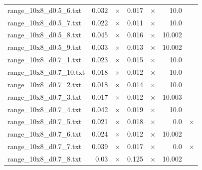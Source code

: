 \documentclass{article}
\begin{document}
\begin{center}
\begin{tabular}{lrrrrrr}
range\_10x8\_d0.5\_6.txt & 0.032 & 
$\times$
 & 0.017 & 
$\times$
 & 10.0 & 
\\
range\_10x8\_d0.5\_7.txt & 0.022 & 
$\times$
 & 0.011 & 
$\times$
 & 10.0 & 
\\
range\_10x8\_d0.5\_8.txt & 0.045 & 
$\times$
 & 0.016 & 
$\times$
 & 10.002 & 
\\
range\_10x8\_d0.5\_9.txt & 0.033 & 
$\times$
 & 0.013 & 
$\times$
 & 10.002 & 
\\
range\_10x8\_d0.7\_1.txt & 0.023 & 
$\times$
 & 0.015 & 
$\times$
 & 10.0 & 
\\
range\_10x8\_d0.7\_10.txt & 0.018 & 
$\times$
 & 0.012 & 
$\times$
 & 10.0 & 
\\
range\_10x8\_d0.7\_2.txt & 0.018 & 
$\times$
 & 0.014 & 
$\times$
 & 10.0 & 
\\
range\_10x8\_d0.7\_3.txt & 0.017 & 
$\times$
 & 0.012 & 
$\times$
 & 10.003 & 
\\
range\_10x8\_d0.7\_4.txt & 0.042 & 
$\times$
 & 0.019 & 
$\times$
 & 10.0 & 
\\
range\_10x8\_d0.7\_5.txt & 0.021 & 
$\times$
 & 0.018 & 
$\times$
 & 0.0 & 
$\times$
\\
range\_10x8\_d0.7\_6.txt & 0.024 & 
$\times$
 & 0.012 & 
$\times$
 & 10.002 & 
\\
range\_10x8\_d0.7\_7.txt & 0.039 & 
$\times$
 & 0.017 & 
$\times$
 & 0.0 & 
$\times$
\\
range\_10x8\_d0.7\_8.txt & 0.03 & 
$\times$
 & 0.125 & 
$\times$
 & 10.002 & 
\\
\hline\end{tabular}
\end{center}
\end{document}
